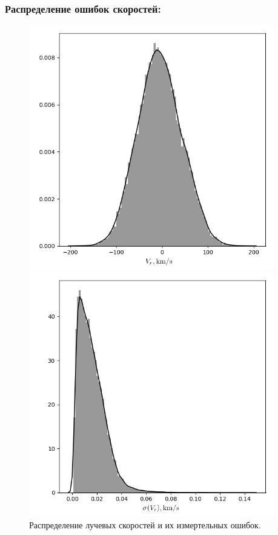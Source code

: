 \documentclass{matmex-diploma-custom}
\begin{document}
\subsubsection*{Распределение ошибок скоростей:}
\begin{figure}[h!]
\caption{Распределение лучевых скоростей и их измертельных ошибок.}
\begin{minipage}[h]{0.49\linewidth}
        \includegraphics[width=0.95\textwidth]{../imgs/vr_distr.png}
\end{minipage}
\hfill
\begin{minipage}[h]{0.49\linewidth}
        \includegraphics[width=0.95\textwidth]{../imgs/vr_err_distr.png}
\end{minipage}
\end{figure}
\end{document}
